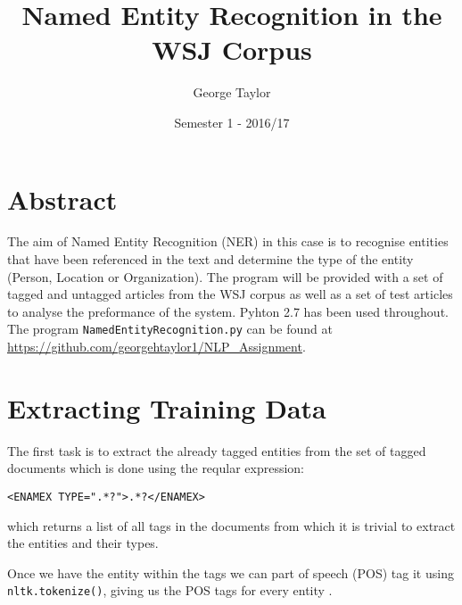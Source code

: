 \documentclass[draft]{article}
\title{Named Entity Recognition in the WSJ Corpus}
\author{George Taylor}
\date{Semester 1 - 2016/17}
\begin{document}
\nocite{*}


\maketitle
\begin{multicols*}{2}

\section*{Abstract}
The aim of Named Entity Recognition (NER) in this case is to recognise entities that have been referenced in the text and determine the type of the entity (Person, Location or Organization). The program will be provided with a set of tagged and untagged articles from the WSJ corpus as well as a set of test articles to analyse the preformance of the system. Pyhton 2.7 has been used throughout. The program \texttt{NamedEntityRecognition.py} can be found at \href{https://github.com/georgehtaylor1/NLP_Assignment}{https://github.com/georgehtaylor1/NLP\_Assignment}.

\section*{Extracting Training Data}
The first task is to extract the already tagged entities from the set of tagged documents which is done using the reqular expression: \begin{verbatim}<ENAMEX TYPE=".*?">.*?</ENAMEX>\end{verbatim} which returns a list of all tags in the documents from which it is trivial to extract the entities and their types.

Once we have the entity within the tags we can part of speech (POS) tag it using \texttt{nltk.tokenize()}, giving us the POS tags for every entity \citep{NLPChunker}.


\end{multicols*}
\end{document}
